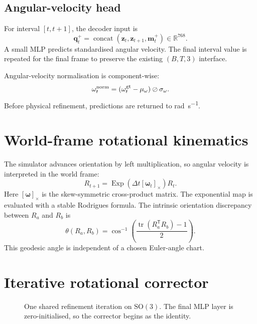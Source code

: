 \documentclass[11pt,a4paper]{article}
\newcommand{\R}{\mathbb R}
\newcommand{\SO}{\mathrm{SO}}
\newcommand{\Exp}{\operatorname{Exp}}
\newcommand{\vect}[1]{\mathbf{#1}}
\begin{document}
\subsection{Angular-velocity head}
For interval $[t,t+1]$, the decoder input is
\begin{equation}
\vect q_t^+=\operatorname{concat}(\vect z_t,\vect z_{t+1},\vect m_t^+)\in\R^{768}.
\end{equation}
A small MLP predicts standardised angular velocity. The final interval value is repeated for the final frame to preserve the existing $(B,T,3)$ interface.

Angular-velocity normalisation is component-wise:
\begin{equation}
\vect\omega_t^{\rm norm}=(\vect\omega_t^{\rm gt}-\vect\mu_\omega)\oslash\vect\sigma_\omega.
\end{equation}
Before physical refinement, predictions are returned to \si{\radian\per\second}.

\section{World-frame rotational kinematics}
The simulator advances orientation by left multiplication, so angular velocity is interpreted in the world frame:
\begin{equation}
R_{t+1}=\Exp(\Delta t[\vect\omega_t]_\times)R_t.
\end{equation}
Here $[\vect\omega]_\times$ is the skew-symmetric cross-product matrix. The exponential map is evaluated with a stable Rodrigues formula. The intrinsic orientation discrepancy between $R_a$ and $R_b$ is
\begin{equation}
\theta(R_a,R_b)=\cos^{-1}\left(\frac{\operatorname{tr}(R_a^\mathsf T R_b)-1}{2}\right).
\end{equation}
This geodesic angle is independent of a chosen Euler-angle chart.

\section{Iterative rotational corrector}
\begin{figure}[H]
\centering
\resizebox{\textwidth}{!}{}
\caption{One shared refinement iteration on $\SO(3)$. The final MLP layer is zero-initialised, so the corrector begins as the identity.}
\label{fig:corrector}
\end{figure}
\end{document}
